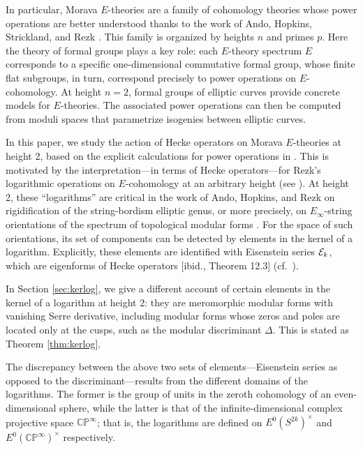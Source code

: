\documentclass{gtpart}
\theoremstyle{definition}
\theoremstyle{remark}
\newcommand{\mb}[1]{\mathbb{#1}}
\newcommand{\CE}{{\cal E}}
\newcommand{\BC}{{\mb C}}
\newcommand{\BP}{{\mb P}}
\renewcommand{\D}{\Delta}
\renewcommand{\=}{\approx}
\renewcommand{\-}{\sim}
\numberwithin{equation}{section}
\numberwithin{thm}{section}
\begin{document}
In particular, Morava $E$-theories are a family 
of cohomology theories whose power operations 
are better understood thanks to the work of Ando, Hopkins, Strickland, and Rezk \cite{AHS04,cong,h2}.  
This family is organized by heights $n$ and primes $p$.  
Here the theory of formal groups plays a key 
role: each $E$-theory spectrum $E$ corresponds to a specific 
one-dimensional commutative formal group, whose finite 
flat subgroups, in turn, correspond precisely to power operations on $E$-cohomology.  At 
height $n = 2$, formal groups of elliptic curves provide concrete models for 
$E$-theories.  The associated power operations can then be computed from moduli spaces that 
parametrize isogenies between elliptic curves.  

In this paper, we study the action of Hecke operators on Morava $E$-theories 
at height 2, based on the explicit calculations for power operations in 
\cite{h2p2,p3}.  This is motivated by the interpretation---in terms of Hecke operators---for 
Rezk's logarithmic operations on $E$-cohomology at an arbitrary height (see 
\cite[1.12]{log}).  At height 2, these 
``logarithms'' are critical in the work of Ando, Hopkins, and Rezk on rigidification of 
the string-bordism elliptic genus, or more precisely, on $E_\infty$-string orientations 
of the spectrum of topological modular forms \cite{koandtmf}.  
For the space of such orientations, its set of components 
can be detected by elements in the kernel of a logarithm.  
Explicitly, these elements are identified with Eisenstein series $\CE_k$, which are 
eigenforms of Hecke operators [ibid., Theorem 12.3] (cf.~\cite[Theorem 40]{Sprang}).  

In Section \ref{sec:kerlog}, we give a different account of certain elements in the kernel of a 
logarithm at height 2: they are meromorphic modular forms with vanishing Serre derivative, including 
modular forms whose zeros and poles are located only at the cusps, such as the modular discriminant $\D$.  
This is stated as Theorem \ref{thm:kerlog}.  

The discrepancy between the above two sets of elements---Eisenstein series as opposed to the 
discriminant---results from the different domains of the logarithms.  
The former is the group of units in the zeroth cohomology of an even-dimensional sphere, 
while the latter is that of the infinite-dimensional complex projective space 
$\BC\BP^\infty$; that is, the logarithms are defined on $E^0(S^{2 k})^\times$ and $E^0(\BC\BP^\infty)^\times$ respectively.  
\end{document}
